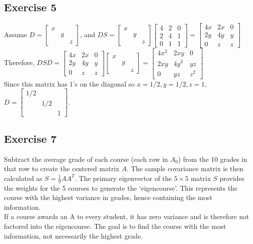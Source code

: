 \documentclass{article}
\begin{document}
\subsection{Exercise 5}
Assume $D = \begin{bmatrix}
    x & & \\
    & y & \\
    & & z
\end{bmatrix}$, and $DS = \begin{bmatrix}
    x & & \\
    & y & \\
    & & z
\end{bmatrix}
\begin{bmatrix}
    4 & 2 & 0 \\
    2 & 4 & 1 \\
    0 & 1 & 1
\end{bmatrix} =
\begin{bmatrix}
    4x & 2x & 0 \\
    2y & 4y & y \\
    0 & z & z
\end{bmatrix}$\\
Therefore, $DSD = \begin{bmatrix}
    4x & 2x & 0 \\
    2y & 4y & y \\
    0 & z & z
\end{bmatrix}
\begin{bmatrix}
    x & & \\
    & y & \\
    & & z
\end{bmatrix} =
\begin{bmatrix}
    4x^{2} & 2xy & 0 \\
    2xy & 4y^{2} & yz \\
    0 & yz & z^{2}
\end{bmatrix}$\\
Since this matrix has 1's on the diagonal so $x = 1/2, y = 1/2, z = 1$, $D = \begin{bmatrix}
    1/2 & & \\
    & 1/2 & \\
    & & 1
\end{bmatrix}$.

\subsection{Exercise 7}
Subtract the average grade of each course (each row in $A_{0}$) from the 10 grades in that row to create the centered matrix $A$. The sample covariance matrix is then calculated as $S = \frac{1}{9} AA^{T}$. The primary eigenvector of the $5 \times 5$ matrix $S$ provides the weights for the 5 courses to generate the `eigencourse'. This represents the course with the highest variance in grades, hence containing the most information.\\
If a course awards an A to every student, it has zero variance and is therefore not factored into the eigencourse. The goal is to find the course with the most information, not necessarily the highest grade.
\end{document}
